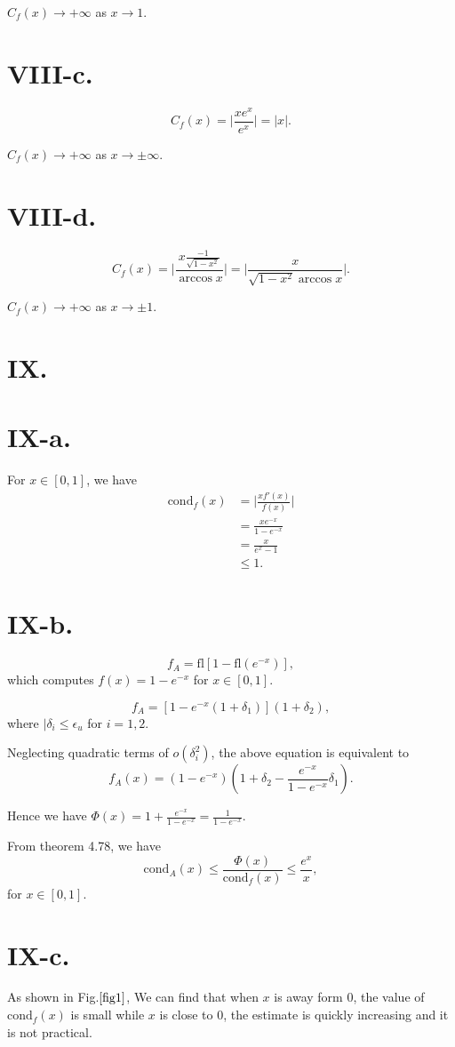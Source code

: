 \documentclass[a4paper]{article}
\begin{document}
$C_f(x)\rightarrow+\infty$ as $x\rightarrow 1$.

\section*{VIII-c.}
$$
C_f(x)=\lvert \dfrac{x e^x}{e^x}\rvert=\lvert x\rvert.
$$

$C_f(x)\rightarrow+\infty$ as $x\rightarrow \pm \infty$.

\section*{VIII-d.}
$$
C_f(x)=\lvert \dfrac{x \frac{-1}{\sqrt{1-x^2}}}{\arccos x}\rvert=\lvert \dfrac{x }{\sqrt{1-x^2} \arccos x}\rvert.
$$

$C_f(x)\rightarrow+\infty$ as $x\rightarrow \pm 1$.

\section*{IX.}
\section*{IX-a.}
For $x\in[0,1]$, we have 
$$
\begin{aligned}
  \mathrm{cond}_f(x)&=\lvert \frac{xf'(x)}{f(x)}\rvert\\
  &=\frac{xe^{-x}}{1-e^{-x}}\\
  &=\frac{x}{e^x-1}\\
  &\leq1.
\end{aligned}
$$

\section*{IX-b.}
$$
f_A=\mathrm{fl}[1-\mathrm{fl}(e^{-x})],
$$
which computes $f(x)=1-e^{-x}$ for $x\in[0,1]$.

$$
f_A=[1-e^{-x}(1+\delta_1)](1+\delta_2),
$$
where $|\delta_i\leq\epsilon_u$ for $i=1,2$.

Neglecting quadratic terms of $o(\delta_i^2)$, the above equation is equivalent to 
$$
f_A(x)=(1-e^{-x})(1+\delta_2-\frac{e^{-x}}{1-e^{-x}}\delta_1).
$$

Hence we have $\Phi(x)=1+\frac{e^{-x}}{1-e^{-x}}=\frac{1}{1-e^{-x}}$.

From theorem 4.78, we have 
$$
\mathrm{cond}_A(x)\leq \dfrac{\Phi(x)}{\mathrm{cond}_f(x)}\leq\frac{e^x}{x},
$$
for $x\in[0,1]$.

\section*{IX-c.}
As shown in Fig.$\ref{fig1}$, We can find that when $x$ is away form $0$, the value of $\mathrm{cond}_f(x)$ is small while $x$ is close to $0$, the estimate is quickly increasing and it is not practical.
\end{document}
